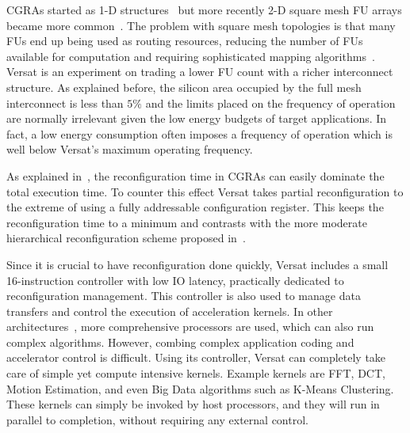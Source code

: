 CGRAs started as 1-D structures~\cite{Ebeling96} but more recently 2-D
square mesh FU arrays became more common~\cite{Lee00,Mei05,Liu15}. The
problem with square mesh topologies is that many FUs end up being used
as routing resources, reducing the number of FUs available for
computation and requiring sophisticated mapping
algorithms~\cite{Liu13}. Versat is an experiment on trading a lower FU
count with a richer interconnect structure. As explained before, the
silicon area occupied by the full mesh interconnect is less than $5\%$
and the limits placed on the frequency of operation are normally
irrelevant given the low energy budgets of target applications. In
fact, a low energy consumption often imposes a frequency of operation
which is well below Versat's maximum operating frequency.

As explained in~\cite{Liu15}, the reconfiguration time in CGRAs can
easily dominate the total execution time. To counter this effect
Versat takes partial reconfiguration to the extreme of using a fully
addressable configuration register. This keeps the reconfiguration
time to a minimum and contrasts with the more moderate hierarchical
reconfiguration scheme proposed in~\cite{Liu15}.

Since it is crucial to have reconfiguration done quickly, Versat
includes a small 16-instruction controller with low IO latency,
practically dedicated to reconfiguration management. This controller
is also used to manage data transfers and control the execution of
acceleration kernels. In other architectures~\cite{Lee00,Mei05,Liu15},
more comprehensive processors are used, which can also run complex
algorithms. However, combing complex application coding and
accelerator control is difficult. Using its controller, Versat can
completely take care of simple yet compute intensive kernels. Example
kernels are FFT, DCT, Motion Estimation, and even Big Data algorithms
such as K-Means Clustering. These kernels can simply be invoked by
host processors, and they will run in parallel to completion, without
requiring any external control.


